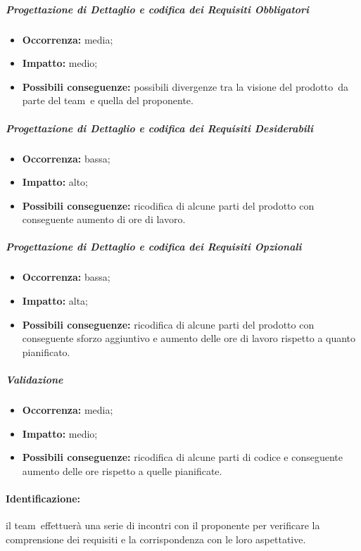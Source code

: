 \documentclass[../PianoProgetto.tex]{subfiles}
\begin{document}
		\subparagraph*{Progettazione di Dettaglio e codifica dei Requisiti Obbligatori}
			\begin{itemize}[label={-}]
				\item \textbf{Occorrenza:} media;
				\item \textbf{Impatto:} medio;
				\item \textbf{Possibili conseguenze:} possibili divergenze tra la visione del prodotto\g\ da parte del team\g\ e quella del proponente.
			\end{itemize}
			
		\subparagraph*{Progettazione di Dettaglio e codifica dei Requisiti Desiderabili}
			\begin{itemize}[label={-}]
				\item \textbf{Occorrenza:} bassa;
				\item \textbf{Impatto:} alto;
				\item \textbf{Possibili conseguenze:} ricodifica di alcune parti del prodotto con conseguente aumento di ore di lavoro.
			\end{itemize}
			
		\subparagraph*{Progettazione di Dettaglio e codifica dei Requisiti Opzionali}
			\begin{itemize}[label={-}]
				\item \textbf{Occorrenza:} bassa;
				\item \textbf{Impatto:} alta;
				\item \textbf{Possibili conseguenze:} ricodifica di alcune parti del prodotto con conseguente sforzo aggiuntivo e aumento delle ore di lavoro rispetto a quanto pianificato.
			\end{itemize}
			
		\subparagraph*{Validazione}
			\begin{itemize}[label={-}]
				\item \textbf{Occorrenza:} media;
				\item \textbf{Impatto:} medio;
				\item \textbf{Possibili conseguenze:} ricodifica di alcune parti di codice e conseguente aumento delle ore rispetto a quelle pianificate.
			\end{itemize}
		
	\paragraph*{Identificazione:} il team\g\ effettuerà una serie di incontri con il proponente per verificare la comprensione dei requisiti e la corrispondenza con le loro aspettative.
	
\end{document}
